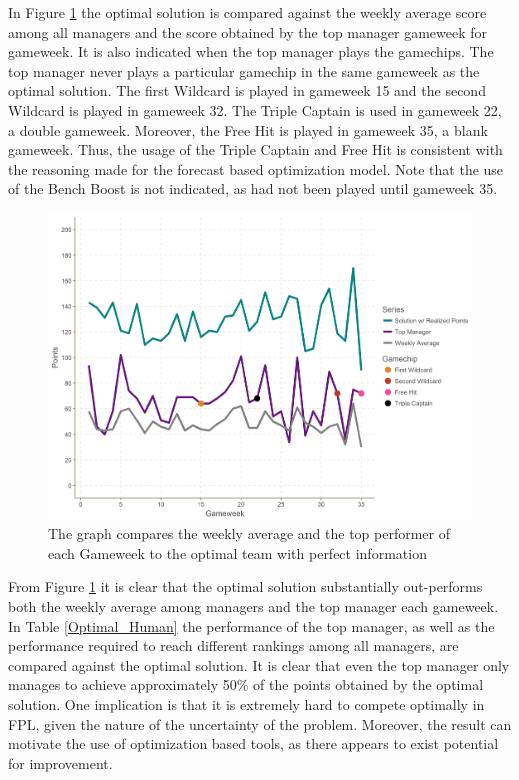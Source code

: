 In Figure \ref{Figure_Comparison} the optimal solution is compared against the weekly average score among all managers and the score obtained by the top manager gameweek for gameweek. It is also indicated when the top manager plays the gamechips. The top manager never plays a particular gamechip in the same gameweek as the optimal solution. The first Wildcard is played in gameweek 15 and the second Wildcard is played in gameweek 32. The Triple Captain is used in gameweek 22, a double gameweek. Moreover, the Free Hit is played in gameweek 35, a blank gameweek. Thus, the usage of the Triple Captain and Free Hit is consistent with the reasoning made for the forecast based optimization model. Note that the use of the Bench Boost is not indicated, as had not been played until gameweek 35.

\begin{figure}[H]
\label{fig:Comparison}
    \centering
    \includegraphics[scale=0.5]{fig/chapter_7/perf_top_avg.png}
    \caption{The graph compares the weekly average and the top performer of each Gameweek to the optimal team with perfect information}
\label{Figure_Comparison}    
\end{figure}

 
From Figure \ref{Figure_Comparison} it is clear that the optimal solution substantially out-performs both the weekly average among managers and the top manager each gameweek. In Table \ref{Optimal_Human} the performance of the top manager, as well as the performance required to reach different rankings among all managers, are compared against the optimal solution. It is clear that even the top manager only manages to achieve approximately 50\% of the points obtained by the optimal solution. One implication is that it is extremely hard to compete optimally in FPL, given the nature of the uncertainty of the problem. Moreover, the result can motivate the use of optimization based tools, as there appears to exist potential for improvement.

